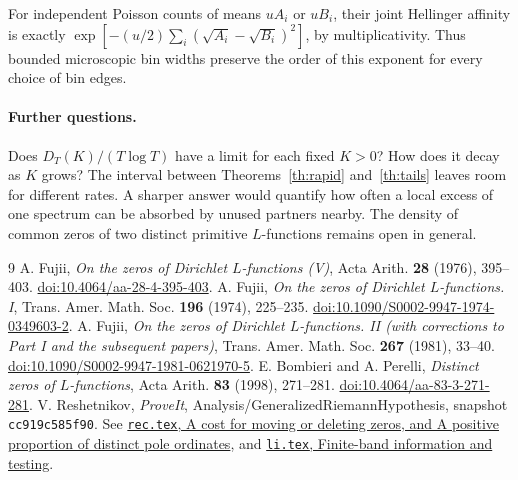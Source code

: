 \documentclass[11pt]{article}
\begin{document}
For independent Poisson counts of means \(uA_i\) or \(uB_i\), their joint
Hellinger affinity is exactly \(\exp[-(u/2)\sum_i(\sqrt{A_i}-\sqrt{B_i})^2]\),
by multiplicativity. Thus bounded microscopic bin widths preserve the order
of this exponent for every choice of bin edges.

\paragraph{Further questions.}
Does \(D_T(K)/(T\log T)\) have a limit for each fixed \(K>0\)? How does it
decay as \(K\) grows? The interval between Theorems~\ref{th:rapid}
and~\ref{th:tails} leaves room for different rates. A sharper answer would
quantify how often a local excess of one spectrum can be absorbed by unused
partners nearby. The density of common zeros of two distinct primitive
\(L\)-functions remains open in general.

\begin{thebibliography}{9}
 A. Fujii, \emph{On the zeros of Dirichlet \(L\)-functions (V)},
Acta Arith. \textbf{28} (1976), 395--403.
\href{https://doi.org/10.4064/aa-28-4-395-403}{doi:10.4064/aa-28-4-395-403}.
 A. Fujii, \emph{On the zeros of Dirichlet \(L\)-functions. I},
Trans. Amer. Math. Soc. \textbf{196} (1974), 225--235.
\href{https://doi.org/10.1090/S0002-9947-1974-0349603-2}{doi:10.1090/S0002-9947-1974-0349603-2}.
 A. Fujii, \emph{On the zeros of Dirichlet \(L\)-functions. II
(with corrections to Part I and the subsequent papers)},
Trans. Amer. Math. Soc. \textbf{267} (1981), 33--40.
\href{https://doi.org/10.1090/S0002-9947-1981-0621970-5}{doi:10.1090/S0002-9947-1981-0621970-5}.
 E. Bombieri and A. Perelli, \emph{Distinct zeros of \(L\)-functions},
Acta Arith. \textbf{83} (1998), 271--281.
\href{https://doi.org/10.4064/aa-83-3-271-281}{doi:10.4064/aa-83-3-271-281}.
 V. Reshetnikov, \emph{ProveIt}, Analysis/GeneralizedRiemannHypothesis,
snapshot \texttt{cc919c585f90}. See
\href{https://github.com/VladimirReshetnikov/ProveIt/blob/cc919c585f90be8e0fba7a1b90c70afdea39998e/Analysis/GeneralizedRiemannHypothesis/Article/sections/rec.tex}{\texttt{rec.tex}, A cost for moving or deleting zeros, and A positive proportion of distinct pole ordinates}, and
\href{https://github.com/VladimirReshetnikov/ProveIt/blob/cc919c585f90be8e0fba7a1b90c70afdea39998e/Analysis/GeneralizedRiemannHypothesis/Article/sections/li.tex}{\texttt{li.tex}, Finite-band information and testing}.
\end{thebibliography}
\end{document}
